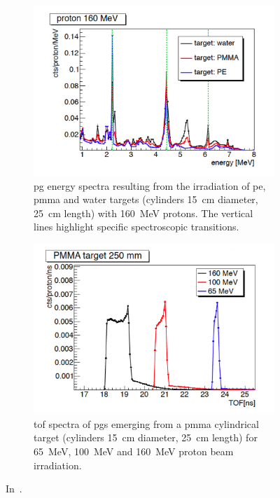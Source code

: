 \begin{figure}
\centering
\begin{subfigure}[t]{.49\textwidth}
\hspace{-1.cm}\includegraphics[width=1.\linewidth]{03_GraphicFiles/chapter2_GammaCameras/PG_E_targets.pdf}
\caption{\gls{pg} energy spectra resulting from the irradiation of \gls{pe}, \gls{pmma} and water targets (cylinders 15~cm diameter, 25~cm length) with 160~MeV protons. The vertical lines highlight specific spectroscopic transitions.}
\label{chap2::fig::PGEdistr}
\end{subfigure}
\begin{subfigure}[t]{.49\textwidth}
\hspace{-0.7cm}\includegraphics[width=1.\linewidth]{03_GraphicFiles/chapter2_GammaCameras/PG_TOF_PMMA.pdf}
\caption{\gls{tof} spectra of \glspl{pg} emerging from a \gls{pmma} cylindrical target (cylinders 15~cm diameter, 25~cm length) for 65~MeV, 100~MeV and 160~MeV proton beam irradiation.}
\label{chap2::fig::PGTdistr}
\end{subfigure}
\caption{In~\cite{Krimmer2017}.}
\label{chap2::fig::PG_ET}
\end{figure}

